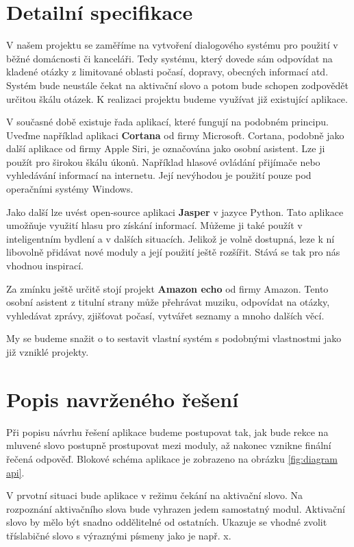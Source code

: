 \documentclass[12pt,a4paper]{article}
\begin{document}
\section*{Detailní specifikace}
V našem projektu se zaměříme na vytvoření dialogového systému pro použití v běžné domácnosti či kanceláři. Tedy systému, který dovede sám odpovídat na kladené otázky z limitované oblasti počasí, dopravy, obecných informací atd. Systém bude neustále čekat na aktivační slovo a potom bude schopen zodpovědět určitou škálu otázek. K realizaci projektu budeme využívat již existující aplikace. 

V současné době existuje řada aplikací, které fungují na podobném principu. Uveďme například aplikaci \textbf{Cortana} od firmy Microsoft. Cortana, podobně jako další aplikace od firmy Apple Siri, je označována jako osobní asistent. Lze ji použít pro širokou škálu úkonů. Například hlasové ovládání přijímače nebo vyhledávání informací na internetu. Její nevýhodou je použití pouze pod operačními systémy Windows. 

Jako další lze uvést open-source aplikaci \textbf{Jasper} v jazyce Python. Tato aplikace umožňuje využití hlasu pro získání informací. Můžeme ji také použít v inteligentním bydlení a v dalších situacích. Jelikož je volně dostupná, leze k ní libovolně přidávat nové moduly a její použití ještě rozšířit. Stává se tak pro nás vhodnou inspirací. 

Za zmínku ještě určitě stojí projekt \textbf{Amazon echo} od firmy Amazon. Tento osobní asistent z titulní strany může přehrávat muziku, odpovídat na otázky, vyhledávat zprávy, zjišťovat počasí, vytvářet seznamy a mnoho dalších věcí. 

My se budeme snažit o to sestavit vlastní systém s podobnými vlastnostmi jako již vzniklé projekty. 

\section*{Popis navrženého řešení}
Při popisu návrhu řešení aplikace budeme postupovat tak, jak bude rekce na mluvené slovo postupně prostupovat mezi moduly, až nakonec vznikne finální řečená odpověď. Blokové schéma aplikace je zobrazeno na obrázku \ref{fig:diagram api}.

V prvotní situaci bude aplikace v režimu čekání na aktivační slovo. Na rozpoznání aktivačního slova bude vyhrazen jedem samostatný modul. Aktivační slovo by mělo být snadno oddělitelné od ostatních. Ukazuje se vhodné zvolit tříslabičné slovo s výraznými písmeny jako je např. x.
\end{document}

